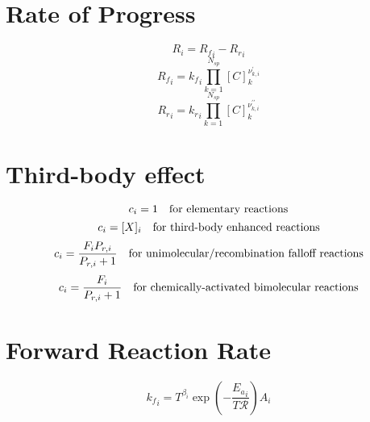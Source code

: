 \documentclass[a4paper,10pt]{article}
\newcommand{\ns}{N_{sp}}
\newcommand{\Ru}{\mathcal{R}}
\begin{document}
\section{Rate of Progress}
\begin{dmath} R_{i} = {R_f}_{i} - {R_r}_{i}\end{dmath} 
\begin{dmath} {R_f}_{i} = {k_f}_{i} \prod_{k=1}^{\ns} [C]_{k}^{\nu^{\prime}_{k,i}}\end{dmath} 
\begin{dmath} {R_r}_{i} = {k_r}_{i} \prod_{k=1}^{\ns} [C]_{k}^{\nu^{\prime\prime}_{k,i}}\end{dmath} 
\section{Third-body effect}
\begin{dmath} c_{i}=1\text{\quad for elementary reactions}\end{dmath} 
\begin{dmath} c_{i}=[X]_{i}\text{\quad for third-body enhanced reactions}\end{dmath} 
\begin{dmath} c_{i}=\frac{F_{i} P_{r, i}}{P_{r, i} + 1}\text{\quad for unimolecular/recombination falloff reactions}\end{dmath} 
\begin{dmath} c_{i}=\frac{F_{i}}{P_{r, i} + 1}\text{\quad for chemically-activated bimolecular reactions}\end{dmath} 
\section{Forward Reaction Rate}
\begin{dmath} {k_f}_{i} = T^{\beta_{i}} \operatorname{exp}\left({- \frac{{E_{a}}_{i}}{T \Ru}}\right) A_{i}\end{dmath} 
\end{document}
